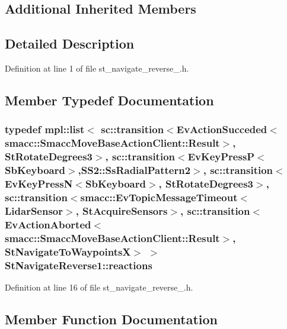 \subsection*{Additional Inherited Members}


\subsection{Detailed Description}


Definition at line 1 of file st\+\_\+navigate\+\_\+reverse\+\_.\+h.



\subsection{Member Typedef Documentation}
\subsubsection[{\texorpdfstring{reactions}{reactions}}]{\setlength{\rightskip}{0pt plus 5cm}typedef mpl\+::list$<$ sc\+::transition$<$Ev\+Action\+Succeded$<$smacc\+::\+Smacc\+Move\+Base\+Action\+Client\+::\+Result$>$, {\bf St\+Rotate\+Degrees3}$>$, sc\+::transition$<$Ev\+Key\+PressP$<$Sb\+Keyboard$>$,{\bf S\+S2\+::\+Ss\+Radial\+Pattern2}$>$, sc\+::transition$<$Ev\+Key\+PressN$<$Sb\+Keyboard$>$, {\bf St\+Rotate\+Degrees3}$>$, sc\+::transition$<${\bf smacc\+::\+Ev\+Topic\+Message\+Timeout}$<${\bf Lidar\+Sensor}$>$, {\bf St\+Acquire\+Sensors}$>$, sc\+::transition$<$Ev\+Action\+Aborted$<$smacc\+::\+Smacc\+Move\+Base\+Action\+Client\+::\+Result$>$, {\bf St\+Navigate\+To\+WaypointsX}$>$ $>$ {\bf St\+Navigate\+Reverse1\+::reactions}}\hypertarget{structStNavigateReverse1_aa19535e726caf8ff80a083ea12ba05af}{}\label{structStNavigateReverse1_aa19535e726caf8ff80a083ea12ba05af}


Definition at line 16 of file st\+\_\+navigate\+\_\+reverse\+\_.\+h.



\subsection{Member Function Documentation}
